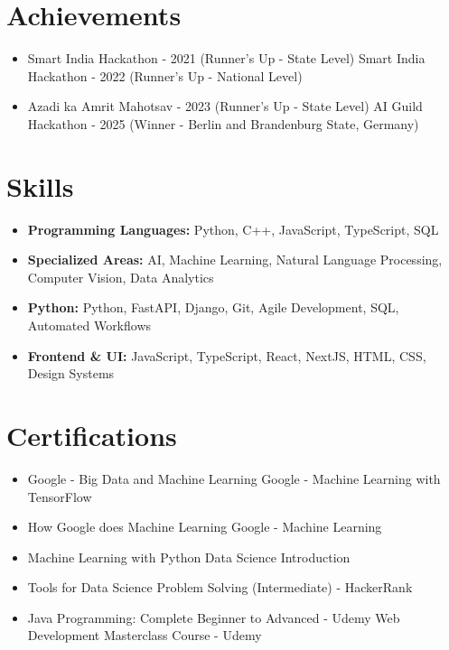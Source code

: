 \documentclass[a4paper,10pt]{article}
\begin{document}
\section*{Achievements}
\begin{itemize}
\item Smart India Hackathon - 2021 (Runner's Up - State Level) \hfill Smart India Hackathon - 2022 (Runner's Up - National Level)
\item Azadi ka Amrit Mahotsav - 2023 (Runner's Up - State Level) \hfill AI Guild Hackathon - 2025 (Winner - Berlin and Brandenburg State, Germany)
\end{itemize}

\section*{Skills}
\begin{itemize}
  \item \textbf{Programming Languages:} Python, C++, JavaScript, TypeScript, SQL
  \item \textbf{Specialized Areas:} AI, Machine Learning, Natural Language Processing, Computer Vision, Data Analytics
  \item \textbf{Python:} Python, FastAPI, Django, Git, Agile Development, SQL, Automated Workflows
  \item \textbf{Frontend \& UI:} JavaScript, TypeScript, React, NextJS, HTML, CSS, Design Systems
\end{itemize}

\section*{Certifications}
\begin{itemize}
\item Google - Big Data and Machine Learning \hfill Google - Machine Learning with TensorFlow
\item How Google does Machine Learning \hfill Google - Machine Learning
\item Machine Learning with Python \hfill Data Science Introduction
\item Tools for Data Science \hfill Problem Solving (Intermediate) - HackerRank
\item Java Programming: Complete Beginner to Advanced - Udemy \hfill Web Development Masterclass Course - Udemy
\end{itemize}
\end{document}
